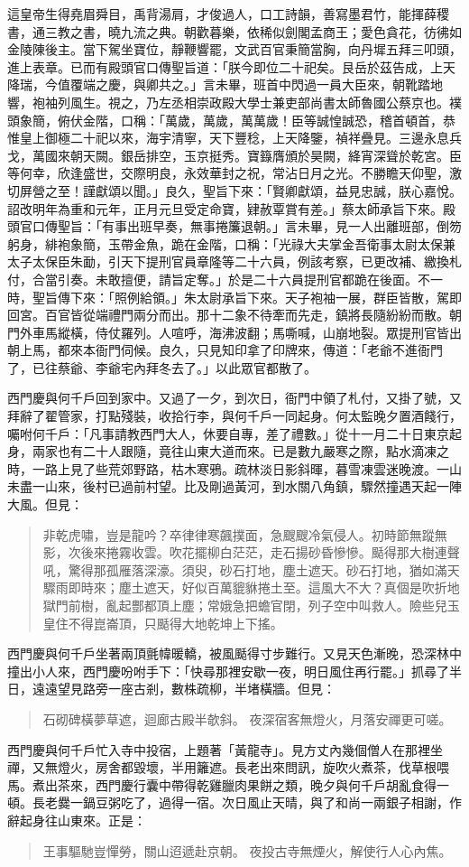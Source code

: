 這皇帝生得堯眉舜目，禹背湯肩，才俊過人，口工詩韻，善寫墨君竹，能揮薛稷書，通三教之書，曉九流之典。朝歡暮樂，依稀似劍閣孟商王；愛色貪花，彷彿如金陵陳後主。當下駕坐寶位，靜鞭響罷，文武百官秉簡當胸，向丹墀五拜三叩頭，進上表章。已而有殿頭官口傳聖旨道：「朕今即位二十祀矣。艮岳於茲告成，上天降瑞，今值覆端之慶，與卿共之。」言未畢，班首中閃過一員大臣來，朝靴踏地響，袍袖列風生。視之，乃左丞相崇政殿大學士兼吏部尚書太師魯國公蔡京也。襆頭象簡，俯伏金階，口稱：「萬歲，萬歲，萬萬歲！臣等誠惶誠恐，稽首頓首，恭惟皇上御極二十祀以來，海宇清寧，天下豐稔，上天降鑒，禎祥疊見。三邊永息兵戈，萬國來朝天闕。銀岳排空，玉京挺秀。寶籙膺頒於昊闕，絳宵深聳於乾宮。臣等何幸，欣逢盛世，交際明良，永效華封之祝，常沾日月之光。不勝瞻天仰聖，激切屏營之至！謹獻頌以聞。」良久，聖旨下來：「賢卿獻頌，益見忠誠，朕心嘉悅。詔改明年為重和元年，正月元旦受定命寶，肄赦覃賞有差。」蔡太師承旨下來。殿頭官口傳聖旨：「有事出班早奏，無事捲簾退朝。」言未畢，見一人出離班部，倒笏躬身，緋袍象簡，玉帶金魚，跪在金階，口稱：「光祿大夫掌金吾衛事太尉太保兼太子太保臣朱勔，引天下提刑官員章隆等二十六員，例該考察，已更改補、繳換札付，合當引奏。未敢擅便，請旨定奪。」於是二十六員提刑官都跪在後面。不一時，聖旨傳下來：「照例給領。」朱太尉承旨下來。天子袍袖一展，群臣皆散，駕即回宮。百官皆從端禮門兩分而出。那十二象不待牽而先走，鎮將長隨紛紛而散。朝門外車馬縱橫，侍仗羅列。人喧呼，海沸波翻；馬嘶喊，山崩地裂。眾提刑官皆出朝上馬，都來本衙門伺候。良久，只見知印拿了印牌來，傳道：「老爺不進衙門了，已往蔡爺、李爺宅內拜冬去了。」以此眾官都散了。

西門慶與何千戶回到家中。又過了一夕，到次日，衙門中領了札付，又掛了號，又拜辭了翟管家，打點殘裝，收拾行李，與何千戶一同起身。何太監晚夕置酒餞行，囑咐何千戶：「凡事請教西門大人，休要自專，差了禮數。」從十一月二十日東京起身，兩家也有二十人跟隨，竟往山東大道而來。已是數九嚴寒之際，點水滴凍之時，一路上見了些荒郊野路，枯木寒鴉。疏林淡日影斜暉，暮雪凍雲迷晚渡。一山未盡一山來，後村已過前村望。比及剛過黃河，到水關八角鎮，驟然撞遇天起一陣大風。但見：
\begin{quote}
非乾虎嘯，豈是龍吟？卒律律寒飆撲面，急颼颼冷氣侵人。初時節無蹤無影，次後來捲霧收雲。吹花擺柳白茫茫，走石揚砂昏慘慘。颳得那大樹連聲吼，驚得那孤雁落深濠。須臾，砂石打地，塵土遮天。砂石打地，猶如滿天驟雨即時來；塵土遮天，好似百萬貔貅捲土至。這風大不大？真個是吹折地獄門前樹，亂起酆都頂上塵；常娥急把蟾官閉，列子空中叫救人。險些兒玉皇住不得崑崙頂，只颳得大地乾坤上下搖。
\end{quote}

西門慶與何千戶坐著兩頂氈幃暖轎，被風颳得寸步難行。又見天色漸晚，恐深林中撞出小人來，西門慶吩咐手下：「快尋那裡安歇一夜，明日風住再行罷。」抓尋了半日，遠遠望見路旁一座古剎，數株疏柳，半堵橫牆。但見：
\begin{quote}
石砌碑橫夢草遮，迴廊古殿半欹斜。
夜深宿客無燈火，月落安禪更可嗟。
\end{quote}

西門慶與何千戶忙入寺中投宿，上題著「黃龍寺」。見方丈內幾個僧人在那裡坐禪，又無燈火，房舍都毀壞，半用籬遮。長老出來問訊，旋吹火煮茶，伐草根喂馬。煮出茶來，西門慶行囊中帶得乾雞臘肉果餅之類，晚夕與何千戶胡亂食得一頓。長老爨一鍋豆粥吃了，過得一宿。次日風止天晴，與了和尚一兩銀子相謝，作辭起身往山東來。正是：
\begin{quote}
王事驅馳豈憚勞，關山迢遞赴京朝。
夜投古寺無煙火，解使行人心內焦。
\end{quote}

